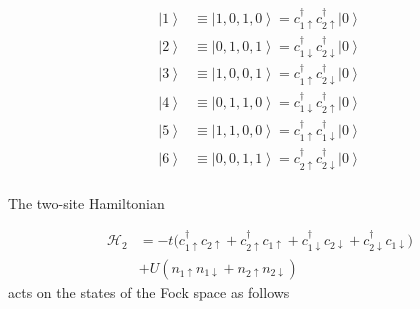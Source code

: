 \documentclass[10pt, twocolumn, twoside]{article}
\begin{document}
\begin{equation}
\begin{split}
\left| 1 \right\rangle &\equiv \left| 1, 0, 1, 0 \right\rangle = c_{1\uparrow}^\dagger c_{2\uparrow}^\dagger \left| 0 \right\rangle \\
\left| 2 \right\rangle &\equiv \left| 0, 1, 0, 1 \right\rangle = c_{1\downarrow}^\dagger c_{2\downarrow}^\dagger \left| 0 \right\rangle \\
\left| 3 \right\rangle &\equiv \left| 1, 0, 0, 1 \right\rangle = c_{1\uparrow}^\dagger c_{2\downarrow}^\dagger \left| 0 \right\rangle \\
\left| 4 \right\rangle &\equiv \left| 0, 1, 1, 0 \right\rangle = c_{1\downarrow}^\dagger c_{2\uparrow}^\dagger \left| 0 \right\rangle \\
\left| 5 \right\rangle &\equiv \left| 1, 1, 0, 0 \right\rangle = c_{1\uparrow}^\dagger c_{1\downarrow}^\dagger \left| 0 \right\rangle \\
\left| 6 \right\rangle &\equiv \left| 0, 0, 1, 1 \right\rangle = c_{2\uparrow}^\dagger c_{2\downarrow}^\dagger \left| 0 \right\rangle \\
\end{split}
\end{equation}

The two-site Hamiltonian

\begin{equation}
\begin{split}
\mathcal{H}_{2} &= - t \bigg( c_{1\uparrow}^\dagger c_{2\uparrow} +  c_{2\uparrow}^\dagger c_{1\uparrow} + c_{1\downarrow}^\dagger c_{2\downarrow} +  c_{2\downarrow}^\dagger c_{1\downarrow} \bigg) \\
& + U (n_{1\uparrow}n_{1\downarrow} + n_{2\uparrow}n_{2\downarrow} )
\end{split}
\end{equation}
acts on the states of the Fock space as follows
\end{document}
